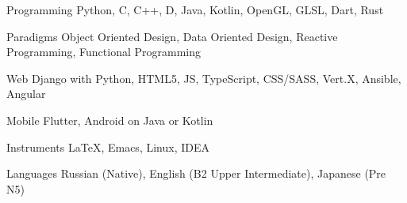 


\begin{cvskills}


\cvskill
{Programming} %
{Python, C, C++, D, Java, Kotlin, OpenGL, GLSL, Dart, Rust} %

\cvskill
{Paradigms} %
{Object Oriented Design, Data Oriented Design, Reactive Programming, Functional Programming}



\cvskill
{Web} %
{Django with Python, HTML5, JS, TypeScript, CSS/SASS, Vert.X, Ansible, Angular} %

\cvskill
{Mobile} %
{Flutter, Android on Java or Kotlin} %

\cvskill
{Instruments}
{LaTeX, Emacs, Linux, IDEA}


\cvskill
{Languages} %
{Russian (Native), English (B2 Upper Intermediate), Japanese (Pre N5)} %


\end{cvskills}
